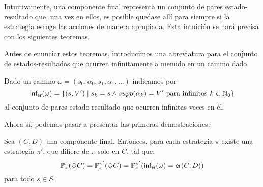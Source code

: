 Intuitivamente, una componente final representa un conjunto de pares
estado-resultado que, una vez en ellos, es posible quedase allí para siempre si
la estrategia escoge las acciones de manera apropiada. Esta intuición se hará
precisa con los siguientes teoremas.

Antes de enunciar estos teoremas, introducimos una abreviatura para el conjunto
de estados-resultados que ocurren infinitamente a menudo en un camino dado. %

\begin{definition}[$\inft$]
	Dado un camino $\omega = (s_0, \alpha_0, s_1, \alpha_1, \dots)$ indicamos por
	\[
		\textsf{inf}_\textsf{er} (\omega) = \{(s, V') \mid s_k = s \wedge supp(\alpha_k) = V' \text{ para infinitos } k \in \mathbb{N}_0\}
	\]
	al conjunto de pares estado-resultado que ocurren infinitas veces en él.
\end{definition}

Ahora sí, podemos pasar a presentar las primeras demostraciones:

\begin{theorem}
	\label{teoEstabilidadEC}
	Sea $(C, D)$ una componente final. Entonces, para cada estrategia $\pi$ existe una estrategia $\pi'$, que difiere de $\pi$ solo en $C$, tal que:
	\begin{equation} \label{estabEC}
		\mathbb{P}^\pi_s(\diamondsuit C) = \mathbb{P}^{\pi'}_s(\diamondsuit C) = \mathbb{P}^{\pi'}_s(\textsf{inf}_\textsf{er}(\omega) = \textsf{er}(C,D))
	\end{equation}
	para todo $s \in S$.
\end{theorem}

